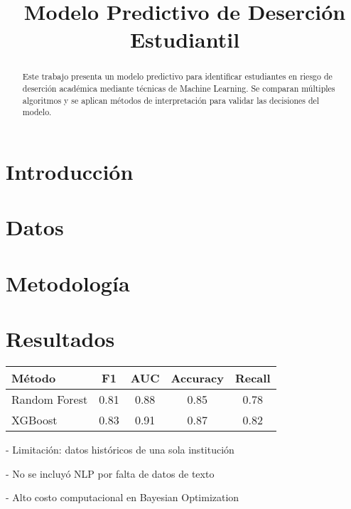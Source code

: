 \documentclass[10pt, conference]{IEEEtran}
\title{Modelo Predictivo de Deserción Estudiantil}
\author{
    \IEEEauthorblockN{Equipo 1}
    \IEEEauthorblockA{Universidad Ejemplo, Departamento de Ciencia de Datos}
}
\begin{document}
\maketitle

\begin{abstract}
Este trabajo presenta un modelo predictivo para identificar estudiantes en riesgo de deserción académica mediante técnicas de Machine Learning. 
Se comparan múltiples algoritmos y se aplican métodos de interpretación para validar las decisiones del modelo.
\end{abstract}

\section{Introducción}

\section{Datos}

\section{Metodología}

\section{Resultados}
\begin{tabular}{|l|c|c|c|c|}
\hline
Método & F1 & AUC & Accuracy & Recall \\
\hline
Random Forest & 0.81 & 0.88 & 0.85 & 0.78 \\
XGBoost & 0.83 & 0.91 & 0.87 & 0.82 \\
\hline
\end{tabular}


    
- Limitación: datos históricos de una sola institución
    
- No se incluyó NLP por falta de datos de texto
    
- Alto costo computacional en Bayesian Optimization
\end{document}
